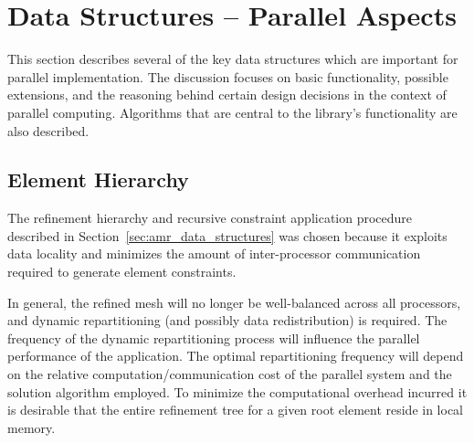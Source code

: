 \section{Data Structures -- Parallel Aspects\label{sec:dsr}}
This section describes several of the key \libMesh{} data structures
which are important for parallel implementation.  The discussion
focuses on basic functionality, possible extensions, and the reasoning
behind certain design decisions in the context of parallel computing.
Algorithms that are central to the library's functionality are also
described.

\subsection{Element Hierarchy}
The refinement hierarchy and recursive constraint application procedure described in Section~\ref{sec:amr_data_structures} was chosen because it exploits data locality and minimizes the amount of inter-processor communication required to generate element constraints.

In general, the refined mesh will no longer be well-balanced across all
processors, and dynamic repartitioning (and possibly data
redistribution) is required.  The frequency of the dynamic
repartitioning process will influence the parallel performance of the
application.  The optimal repartitioning frequency will depend on the
relative computation/communication cost of the parallel system and the
solution algorithm employed.  To minimize the computational overhead incurred it is desirable that the entire refinement tree for a given root element reside in local memory.


